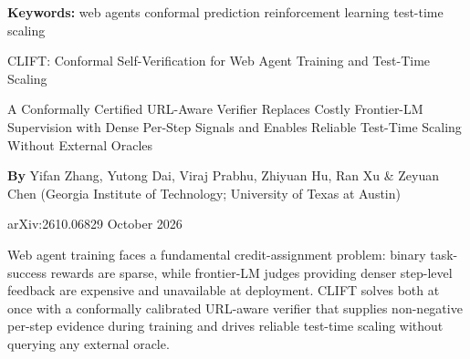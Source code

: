 \documentclass[10pt,twocolumn]{article}
\begin{document}
\setlength{\parindent}{0pt}
\setlength{\parskip}{4pt}

{\small\color{keywordgray}\textbf{Keywords:}
  web agents \textbullet{}
  conformal prediction \textbullet{}
  reinforcement learning \textbullet{}
  test-time scaling}\par\vspace{4pt}

{\LARGE\bfseries\raggedright
  CLIFT: Conformal Self-Verification for Web Agent Training and
  Test-Time Scaling}\par\vspace{4pt}

{\large\itshape\raggedright
  A Conformally Certified URL-Aware Verifier Replaces Costly Frontier-LM
  Supervision with Dense Per-Step Signals and Enables Reliable Test-Time
  Scaling Without External Oracles}\par\vspace{6pt}

{\small\textbf{By} Yifan Zhang, Yutong Dai, Viraj Prabhu, Zhiyuan Hu,
  Ran Xu \& Zeyuan Chen
  (Georgia Institute of Technology; University of Texas at Austin)}\par\vspace{2pt}

{\small\color{keywordgray}arXiv:2610.06829 \textbullet{} October 2026}
\par\vspace{2pt}\noindent{\color{rulered}\rule{\columnwidth}{0.6pt}}\vspace{6pt}

Web agent training faces a fundamental credit-assignment problem: binary
task-success rewards are sparse, while frontier-LM judges providing denser
step-level feedback are expensive and unavailable at deployment. CLIFT solves
both at once with a conformally calibrated URL-aware verifier that supplies
non-negative per-step evidence during training and drives reliable test-time
scaling without querying any external oracle.
\end{document}
